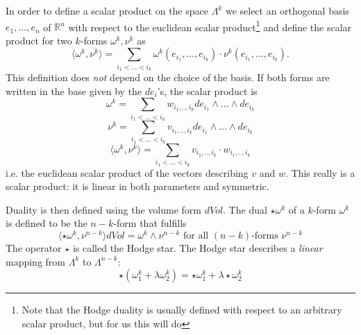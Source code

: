 In order to define a scalar product on the space $\Lambda^k$ we select an orthogonal basis $e_1,...,e_n$ of $\mathbb R^n$ with respect to the euclidean scalar product\footnote{Note that the Hodge duality is usually defined with respect to an arbitrary scalar product, but for us this will do} and define the scalar product for two $k$-forms $\omega^k, \nu^k$ as
\[\langle \omega^k, \nu^k \rangle = \sum_{i_1 <...<i_k} \omega^k(e_{i_1},...,e_{i_k})\cdot \nu^k(e_{i_1},...,e_{i_k}).\]
This definition does \emph{not} depend on the choice of the basis. If both forms are written in the base given by the $de_i$'s, the scalar product is
\[\omega^k = \sum_{i_1<...<i_k}w_{i_1,..,i_k} de_{i_1}\wedge ...\wedge de_{i_k}\]
\[\nu^k = \sum_{i_1<...<i_k}v_{i_1,..,i_k} de_{i_1}\wedge ...\wedge de_{i_k}\]
\[\langle \omega^k, \nu^k\rangle = \sum_{i_1<...<i_k} v_{i_1,..,i_k} \cdot w_{i_1,..,i_k}\]
i.e. the euclidean scalar product of the vectors describing $v$ and $w$. This really is a scalar product: it is linear in both parameters and symmetric.

Duality is then defined using the volume form $dVol$. The dual $\star\omega^k$ of a $k$-form $\omega^k$ is defined to be the $n-k$-form that fulfills
\[\langle\star\omega^k, \nu^{n-k}\rangle dVol  = \omega^k \wedge \nu^{n-k} \text{ for all $(n-k)$-forms $\nu^{n-k}$}\] 
The operator $\star$ is called the Hodge star. The Hodge star describes a \emph{linear} mapping from $\Lambda^k$ to $\Lambda^{n-k}$:
 \[\star(\omega_1^k + \lambda \omega_2^k) = \star\omega_1^k + \lambda \star\omega_2^k \]

